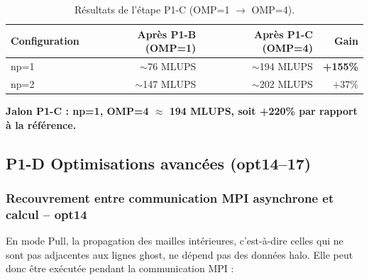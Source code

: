 \documentclass[a4paper,11pt,oneside]{report}
\begin{document}
\begin{table}[H]
\centering
\begin{tabular}{@{}lrrr@{}}
\toprule
\textbf{Configuration} & \textbf{Après P1-B (OMP=1)} & \textbf{Après P1-C (OMP=4)} & \textbf{Gain} \\
\midrule
np=1 & $\sim$76 MLUPS  & $\sim$194 MLUPS & \textbf{+155\%} \\
np=2 & $\sim$147 MLUPS & $\sim$202 MLUPS & +37\% \\
\bottomrule
\end{tabular}
\caption{Résultats de l'étape P1-C (OMP=1 $\to$ OMP=4).}
\end{table}

\textbf{Jalon P1-C : np=1, OMP=4 $\approx$ 194 MLUPS, soit +220\% par rapport à la référence.}

\subsection{P1-D \quad Optimisations avancées (opt14–17)}

\subsubsection{Recouvrement entre communication MPI asynchrone et calcul -- opt14}

En mode Pull, la propagation des mailles intérieures, c'est-à-dire celles qui ne sont pas
adjacentes aux lignes ghost, ne dépend pas des données halo. Elle peut donc être exécutée
pendant la communication MPI :
\end{document}
